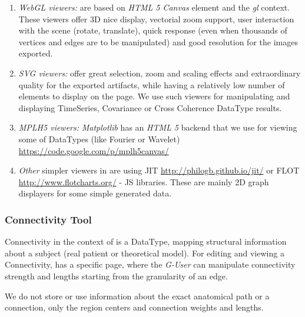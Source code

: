 \begin{enumerate}

	\item \emph{WebGL viewers:} are based on \emph{HTML 5 Canvas} element and the \emph{gl} context. 
	These viewers offer 3D nice display, vectorial zoom support, user interaction with the scene (rotate, translate), quick response 
	(even when thousands of vertices and edges are to be manipulated) and good resolution for the images exported.
	
	\item \emph{SVG viewers:} offer great selection, zoom and scaling effects and extraordinary quality for the exported artifacts, while having 
	a relatively low number of elements to display on the page. 
	We use such viewers for manipulating and displaying TimeSeries, Covariance or Cross Coherence DataType results.
	
	\item \emph{MPLH5 viewers:} \emph{Matplotlib} has an \emph{HTML 5} backend that we use for viewing some of \TVB DataTypes (like Fourier or Wavelet)
	\url{https://code.google.com/p/mplh5canvas/}
	
	\item \emph{Other} simpler viewers in \TVB are using JIT \url{http://philogb.github.io/jit/} or FLOT \url{http://www.flotcharts.org/} - JS libraries.
	These are mainly 2D graph displayers for some simple \TVB generated data.

\end{enumerate}


	\subsubsection{Connectivity Tool}

Connectivity in the context of \TVB is a DataType, mapping structural information about a subject (real patient or theoretical model).
For editing and viewing a Connectivity, \TVB has a specific page, where the \emph{G-User} can manipulate connectivity strength and lengths 
starting from the granularity of an edge.

We do not store or use information about the exact anatomical path or a connection, only the region centers and connection weights and lengths.

